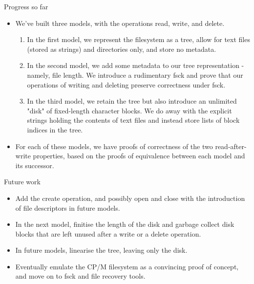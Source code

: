 \documentclass{beamer}
\begin{document}
\begin{frame}{Progress so far}
  \begin{itemize}
    \item We've built three models, with the operations read, write,
      and delete.
      \begin{enumerate}
      \item In the first model, we represent the filesystem as a tree,
        allow for text files (stored as strings) and directories only,
        and store no metadata.
      \item In the second model, we add some metadata to our tree
        representation - namely, file length. We introduce a
        rudimentary fsck and prove that our operations of writing and
        deleting preserve correctness under fsck.
      \item In the third model, we retain the tree but also introduce
        an unlimited "disk" of fixed-length character blocks. We do
        away with the explicit strings holding the contents of text
        files and instead store lists of block indices in the tree.
      \end{enumerate}
    \item For each of these models, we have proofs of correctness of
      the two read-after-write properties, based on the proofs of
      equivalence between each model and its successor.
  \end{itemize}
\end{frame}

\begin{frame}{Future work}
  \begin{itemize}
  \item Add the create operation, and possibly open and close with the
    introduction of file descriptors in future models.
  \item In the next model, finitise the length of the disk and garbage
    collect disk blocks that are left unused after a write or a delete
    operation.
  \item In future models, linearise the tree, leaving only the disk.
  \item Eventually emulate the CP/M filesystem as a convincing proof
    of concept, and move on to fsck and file recovery tools.
  \end{itemize}
\end{frame}
\end{document}
